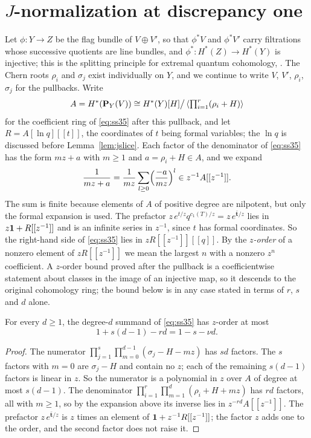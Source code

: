 \section{\texorpdfstring{\(J\)}{J}-normalization at discrepancy one}
\label{sec:normalization}

Let \(\phi\colon Y\to Z\) be the flag bundle of \(V\oplus V'\), so that
\(\phi^{*}V\) and \(\phi^{*}V'\) carry filtrations whose successive quotients
are line bundles, and \(\phi^{*}\colon H^{*}(Z)\to H^{*}(Y)\) is injective;
this is the splitting principle for extremal quantum cohomology,
\cite[Corollary~4.3]{SS}.  The Chern roots \(\rho_{i}\) and \(\sigma_{j}\)
exist individually on \(Y\), and we continue to write \(V\), \(V'\),
\(\rho_{i}\), \(\sigma_{j}\) for the pullbacks.  Write
\[
  A=H^{*}(\mathbf P_{Y}(V))
   \cong H^{*}(Y)[H]\big/\left\langle
     \textstyle\prod_{i=1}^{r}(\rho_i+H)\right\rangle
\]
for the coefficient ring of \eqref{eq:ss35} after this pullback, and let
\(R=A[\ln q][[t]]\), the coordinates of \(t\) being formal variables; the
\(\ln q\) is discussed before Lemma~\ref{lem:jslice}.  Each factor of the
denominator of \eqref{eq:ss35} has the form \(mz+a\) with \(m\ge1\) and
\(a=\rho_{i}+H\in A\), and we expand
\[
  \frac1{mz+a}
  =\frac1{mz}\sum_{l\ge0}\Bigl(\frac{-a}{mz}\Bigr)^{l}\in z^{-1}A[[z^{-1}]].
\]
The sum is finite because elements of \(A\) of positive degree are nilpotent,
but only the formal expansion is used.  The prefactor
\(z\,e^{t/z}q^{c_{1}(T)/z}=z\,e^{\bar{\mathbf t}/z}\) lies in
\(z\mathbf 1+R[[z^{-1}]]\) and is an infinite series in \(z^{-1}\), since \(t\) has
formal coordinates.  So the right-hand side of \eqref{eq:ss35} lies in
\(zR[[z^{-1}]][[q]]\).
By the \emph{\(z\)-order} of a nonzero element of \(zR[[z^{-1}]]\) we mean the
largest \(n\) with a nonzero \(z^{n}\) coefficient.  A \(z\)-order bound proved after the pullback
is a coefficientwise statement about classes in the image of an injective
map, so it descends to the original cohomology ring; the bound below is in
any case stated in terms of \(r\), \(s\) and \(d\) alone.

\begin{lemma}
  \label{lem:order}
  For every \(d\ge1\), the degree-\(d\) summand of \eqref{eq:ss35} has
  \(z\)-order at most
  \[
    1+s(d-1)-rd=1-s-\nu d .
  \]
\end{lemma}

\begin{proof}
  The numerator \(\prod_{j=1}^{s}\prod_{m=0}^{d-1}(\sigma_{j}-H-mz)\) has
  \(sd\) factors.  The \(s\) factors with \(m=0\) are \(\sigma_{j}-H\) and
  contain no \(z\); each of the remaining \(s(d-1)\) factors is linear in
  \(z\).  So the numerator is a polynomial in \(z\) over \(A\) of degree at
  most \(s(d-1)\).  The denominator \(\prod_{i=1}^{r}\prod_{m=1}^{d}(\rho_{i}
  +H+mz)\) has \(rd\) factors, all with \(m\ge1\), so by the expansion above
  its inverse lies in \(z^{-rd}A[[z^{-1}]]\).  The prefactor
  \(z\,e^{\bar{\mathbf t}/z}\) is \(z\) times an element of
  \(\mathbf 1+z^{-1}R[[z^{-1}]]\); the factor \(z\) adds one to the order, and the
  second factor does not raise it.
\end{proof}

